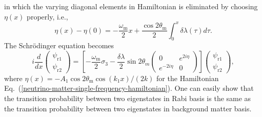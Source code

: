 \documentclass[%
reprint,
 amsmath,amssymb,
 aps,
]{revtex4-1}
\begin{document}
in which the varying diagonal elements in Hamiltonian is eliminated by choosing $\eta(x)$ properly, i.e.,
\begin{equation}
    \eta(x) - \eta(0) = - \frac{\omega_{\mathrm{m}}}{2} x + \frac{\cos 2\theta_{\mathrm{m}}}{2} \int_0^x \delta\lambda (\tau) d\tau.
\end{equation}
The Schr\"{o}dinger equation becomes
\begin{equation}
    i \frac{d}{dx} \begin{pmatrix} \psi_{\mathrm r1} \\ \psi_{\mathrm r2} \end{pmatrix} = \left[ - \frac{\omega_{\mathrm m}}{2} \sigma_3 - \frac{\delta \lambda}{2} \sin 2\theta_m \begin{pmatrix} 0 & e^{2i\eta} \\ e^{-2 i\eta } & 0 \end{pmatrix}\right] \begin{pmatrix} \psi_{\mathrm r1} \\ \psi_{\mathrm r2} \end{pmatrix},
\end{equation}
where $\eta(x) = - A_1 \cos 2\theta_{\mathrm m} \cos (k_1 x)/(2 k) $ for the Hamiltonian Eq.~(\ref{neutrino-matter-single-frequency-hamiltonian}).  One can easily show that the transition probability between two eigenstates in Rabi basis is the same as the transition probability between two eigenstates in background matter basis.
\end{document}
